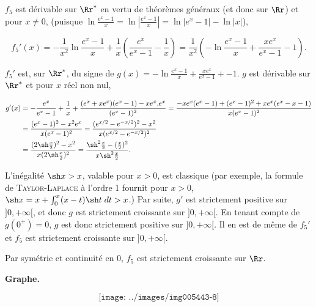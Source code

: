 {\begin{enumerate}
{{{{{$f_5$ est dérivable sur $\Rr^*$ en vertu de théorèmes généraux (et donc sur $\Rr$) et pour $x\neq 0$, (puisque $\ln\frac{e^x-1}{x}=\ln\left|\frac{e^x-1}{x}\right|=\ln|e^x-1|-\ln|x|$),

$$f_5'(x)=-\frac{1}{x^2}\ln\frac{e^x-1}{x}+\frac{1}{x}(\frac{e^x}{e^x-1}-\frac{1}{x})
=\frac{1}{x^2}(-\ln\frac{e^x-1}{x}+\frac{xe^x}{e^x-1}-1).$$

$f_5'$ est, sur $\Rr^*$, du signe de $g(x)=-\ln\frac{e^x-1}{x}+\frac{xe^x}{e^x-1}+-1$. $g$ est dérivable sur $\Rr^*$ et pour $x$ réel non nul,

\begin{align*}\ensuremath
g'(x)&=-\frac{e^x}{e^x-1}+\frac{1}{x}+\frac{(e^x+xe^x)(e^x-1)-xe^x.e^x}{(e^x-1)^2}
=\frac{-xe^x(e^x-1)+(e^x-1)^2+xe^x(e^x-x-1)}{x(e^x-1)^2}\\
 &=\frac{(e^x-1)^2-x^2e^x}{x(e^x-1)^2}=\frac{(e^{x/2}-e^{-x/2})^2-x^2}{x(e^{x/2}-e^{-x/2})^2}\\
 &=\frac{(2\sh\frac{x}{2})^2-x^2}{x(2\sh\frac{x}{2})^2}=\frac{\sh^2\frac{x}{2}-(\frac{x}{2})^2}{x\sh^2\frac{x}{2}}.
\end{align*} 
 
L'inégalité $\sh x>x$, valable pour $x>0$, est classique (par exemple, la formule de \textsc{Taylor}-\textsc{Laplace} à l'ordre 1 fournit pour $x>0$, $\sh x=x+\int_{0}^{x}(x-t)\sh t\;dt>x$.) Par suite, $g'$ est strictement positive sur $]0,+\infty[$, et donc $g$ est strictement croissante sur $]0,+\infty[$. En tenant compte de $g(0^+)= 0$, $g$ est donc strictement positive sur $]0,+\infty[$. Il en est de même de $f_5'$ et $f_5$ est strictement croissante sur $]0,+\infty[$.

Par symétrie et continuité en $0$, $f_5$ est strictement croissante sur $\Rr$.

\textbf{Graphe.}

$$\texttt{[image: ../images/img005443-8]}$$


  \item {}}}}}}
\end{enumerate}}

